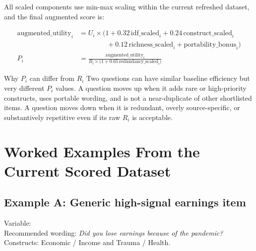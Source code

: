 \documentclass[12pt]{article}
\begin{document}
All scaled components use min-max scaling within the current refreshed dataset, and the final augmented score is:

\begin{align*}
\text{augmented\_utility}_i &= U_i \times \bigl(1 + 0.32\,\text{idf\_scaled}_i + 0.24\,\text{construct\_scaled}_i \\
&\qquad\qquad + 0.12\,\text{richness\_scaled}_i + \text{portability\_bonus}_i\bigr) \\
P_i &= \frac{\text{augmented\_utility}_i}{B_i \times \bigl(1 + 0.65\,\text{redundancy\_scaled}_i\bigr)}
\end{align*}

\begin{psidbox}{Why $P_i$ can differ from $R_i$}
Two questions can have similar baseline efficiency but very different $P_i$ values. A question moves up when it adds rare or high-priority constructs, uses portable wording, and is not a near-duplicate of other shortlisted items. A question moves down when it is redundant, overly source-specific, or substantively repetitive even if its raw $R_i$ is acceptable.
\end{psidbox}

\section{Worked Examples From the Current Scored Dataset}

\subsection{Example A: Generic high-signal earnings item}

Variable: \\
Recommended wording: \emph{Did you lose earnings because of the pandemic?}\\
Constructs: Economic / Income and Trauma / Health.
\end{document}
